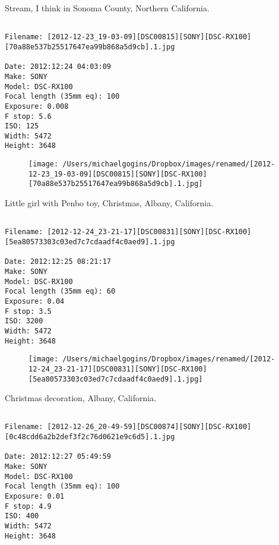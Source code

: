 \documentclass[11pt,letter,DIV=14,paper=landscape]{scrbook}
\begin{document}
\clearpage
\noindent Stream, I think in Sonoma County, Northern California.
\noindent
\begin{lstlisting}

Filename: [2012-12-23_19-03-09][DSC00815][SONY][DSC-RX100][70a88e537b25517647ea99b868a5d9cb].1.jpg

Date: 2012:12:24 04:03:09
Make: SONY
Model: DSC-RX100
Focal length (35mm eq): 100
Exposure: 0.008
F stop: 5.6
ISO: 125
Width: 5472
Height: 3648
\end{lstlisting}
\clearpage

\begin{figure}
\texttt{[image: /Users/michaelgogins/Dropbox/images/renamed/[2012-12-23\_19-03-09][DSC00815][SONY][DSC-RX100][70a88e537b25517647ea99b868a5d9cb].1.jpg]}
\end{figure}
    
\clearpage
\noindent Little girl with Penbo toy, Christmas, Albany, California.
\noindent
\begin{lstlisting}

Filename: [2012-12-24_23-21-17][DSC00831][SONY][DSC-RX100][5ea80573303c03ed7c7cdaadf4c0aed9].1.jpg

Date: 2012:12:25 08:21:17
Make: SONY
Model: DSC-RX100
Focal length (35mm eq): 60
Exposure: 0.04
F stop: 3.5
ISO: 3200
Width: 5472
Height: 3648
\end{lstlisting}
\clearpage

\begin{figure}
\texttt{[image: /Users/michaelgogins/Dropbox/images/renamed/[2012-12-24\_23-21-17][DSC00831][SONY][DSC-RX100][5ea80573303c03ed7c7cdaadf4c0aed9].1.jpg]}
\end{figure}
    
\clearpage
\noindent Christmas decoration, Albany, California.
\noindent
\begin{lstlisting}

Filename: [2012-12-26_20-49-59][DSC00874][SONY][DSC-RX100][0c48cdd6a2b2def3f2c76d0621e9c6d5].1.jpg

Date: 2012:12:27 05:49:59
Make: SONY
Model: DSC-RX100
Focal length (35mm eq): 100
Exposure: 0.01
F stop: 4.9
ISO: 400
Width: 5472
Height: 3648
\end{lstlisting}
\clearpage
\end{document}
